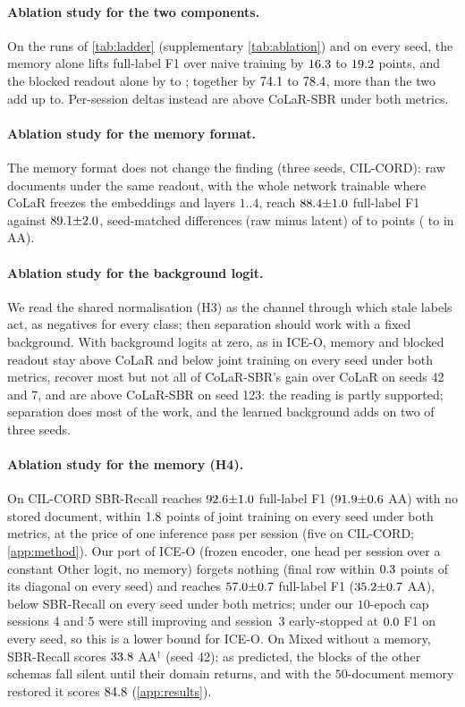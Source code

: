\documentclass[10pt,twocolumn,letterpaper]{article}
\begin{document}
\paragraph{Ablation study for the two components.} On the runs of \cref{tab:ladder} (supplementary \cref{tab:ablation}) and on every seed, the memory alone lifts full-label F1 over naive training by $16.3$ to $19.2$ points, and the blocked readout alone by \nAblReadMin{} to \nAblReadMax; together by $74.1$ to $78.4$, more than the two add up to. Per-session deltas instead are above CoLaR-SBR under both metrics.

\paragraph{Ablation study for the memory format.} The memory format does not change the finding (three seeds, CIL-CORD): raw documents under the same readout, with the whole network trainable where CoLaR freezes the embeddings and layers $1..4$, reach $88.4{\pm}1.0$ full-label F1 against $89.1{\pm}2.0$, seed-matched differences (raw minus latent) of \nErSbrDiffFullMin{} to \nErSbrDiffFullMax{} points (\nErSbrDiffAaMin{} to \nErSbrDiffAaMax{} in AA).

\paragraph{Ablation study for the background logit.} We read the shared normalisation (H3) as the channel through which stale labels act, as negatives for every class; then separation should work with a fixed background. With background logits at zero, as in ICE-O, memory and blocked readout stay above CoLaR and below joint training on every seed under both metrics, recover most but not all of CoLaR-SBR's gain over CoLaR on seeds 42 and 7, and are above CoLaR-SBR on seed 123: the reading is partly supported; separation does most of the work, and the learned background adds on two of three seeds.

\paragraph{Ablation study for the memory (H4).} On CIL-CORD SBR-Recall reaches $92.6{\pm}1.0$ full-label F1 ($91.9{\pm}0.6$ AA) with no stored document, within $1.8$ points of joint training on every seed under both metrics, at the price of one inference pass per session (five on CIL-CORD; \cref{app:method}). Our port of ICE-O (frozen encoder, one head per session over a constant Other logit, no memory) forgets nothing (final row within $0.3$ points of its diagonal on every seed) and reaches $57.0{\pm}0.7$ full-label F1 ($35.2{\pm}0.7$ AA), below SBR-Recall on every seed under both metrics; under our $10$-epoch cap sessions 4 and 5 were still improving and session~3 early-stopped at $0.0$ F1 on every seed, so this is a lower bound for ICE-O. On Mixed without a memory, SBR-Recall scores $33.8$ AA$^\dagger$ (seed 42): as predicted, the blocks of the other schemas fall silent until their domain returns, and with the $50$-document memory restored it scores $84.8$ (\cref{app:results}).
\end{document}
